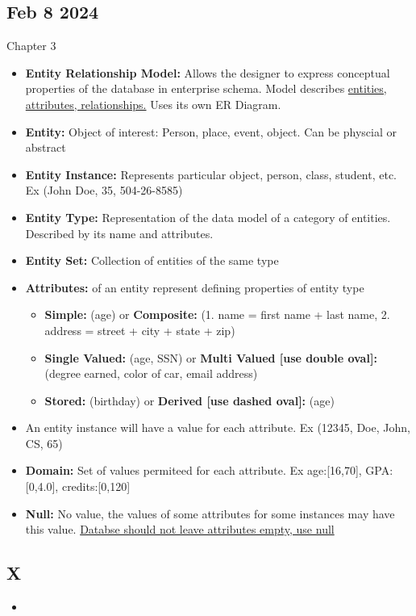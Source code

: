 \documentclass[12pt]{article}
\begin{document}
\subsection*{Feb 8 2024}

Chapter 3

\begin{itemize}
		  \item \textbf{Entity Relationship Model:} Allows the designer to express conceptual properties
					 of the database in enterprise schema. Model describes 
					 \underline{entities, attributes, relationships.}
					 Uses its own ER Diagram.
		  \item \textbf{Entity:} Object of interest: Person, place, event, object. Can be physcial or abstract
		  \item \textbf{Entity Instance:} Represents particular object, person, class, student, etc.
					 Ex (John Doe, 35, 504-26-8585)
		  \item \textbf{Entity Type:} Representation of the data model of a category of entities. Described
					 by its name and attributes. 
		  \item \textbf{Entity Set:} Collection of entities of the same type
		  \item \textbf{Attributes:} of an entity represent defining properties of entity type
					 \begin{itemize}
								\item \textbf{Simple:} (age) or \textbf{Composite:} (1. name = first name + last name, 
										 2. address = street + city + state + zip)
							   \item \textbf{Single Valued:} (age, SSN) or \textbf{Multi Valued [use double oval]:}
										  (degree earned, color of car, email address)
								\item \textbf{Stored:} (birthday) or \textbf{Derived [use dashed oval]:}
										  (age)
					 \end{itemize}
		  \item An entity instance will have a value for each attribute. Ex (12345, Doe, John, CS, 65)
		  \item \textbf{Domain:} Set of values permiteed for each attribute. Ex age:[16,70],
					 GPA:[0,4.0], credits:[0,120]
		  \item \textbf{Null:} No value, the values of some attributes for some instances may have this value.
					 \underline{Databse should not leave attributes empty, use null}
\end{itemize}

\subsection*{X}

\begin{itemize}
		  \item \textbf{}
\end{itemize}
\end{document}
